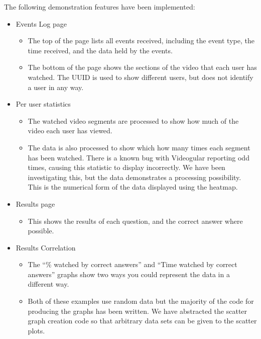 \documentclass[12pt,a4paper]{article}
\begin{document}
The following demonstration features have been implemented:

\begin{itemize}
\item Events Log page
	\begin{itemize}
	\item The top of the page lists all events received, including the event type, the time received, and the data held by the events.
	\item The bottom of the page shows the sections of the video that each user has watched. The UUID is used to show different users, but does not identify a user in any way.
	\end{itemize}

\item Per user statistics
	\begin{itemize}
	\item The watched video segments are processed to show how much of the video each user has viewed.
	\item The data is also processed to show which how many times each segment has been watched. There is a known bug with Videogular reporting odd times, causing this statistic to display incorrectly. We have been investigating this, but the data demonstrates a processing possibility. This is the numerical form of the data displayed using the heatmap.
	\end{itemize}

\item Results page
	\begin{itemize}
	\item This shows the results of each question, and the correct answer where possible.
	\end{itemize}

\item Results Correlation
	\begin{itemize}
	\item The ``\% watched by correct answers'' and ``Time watched by correct answers'' graphs show two ways you could represent the data in a different way.
	\item Both of these examples use random data but the majority of the code for producing the graphs has been written. We have abstracted the scatter graph creation code so that arbitrary data sets can be given to the scatter plots.
	\end{itemize}

\end{itemize}
\end{document}
